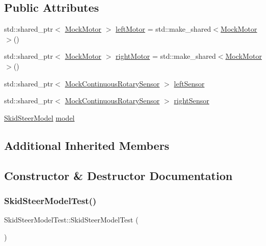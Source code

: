 \subsection*{Public Attributes}
\begin{DoxyCompactItemize}
\item 
std\+::shared\+\_\+ptr$<$ \mbox{\hyperlink{classokapi_1_1MockMotor}{Mock\+Motor}} $>$ \mbox{\hyperlink{classSkidSteerModelTest_ae5f23d1d7503a67dbf677a17915d3960}{left\+Motor}} = std\+::make\+\_\+shared$<$\mbox{\hyperlink{classokapi_1_1MockMotor}{Mock\+Motor}}$>$()
\item 
std\+::shared\+\_\+ptr$<$ \mbox{\hyperlink{classokapi_1_1MockMotor}{Mock\+Motor}} $>$ \mbox{\hyperlink{classSkidSteerModelTest_a77ee903c3e5bb6d5bb9281c34790ac29}{right\+Motor}} = std\+::make\+\_\+shared$<$\mbox{\hyperlink{classokapi_1_1MockMotor}{Mock\+Motor}}$>$()
\item 
std\+::shared\+\_\+ptr$<$ \mbox{\hyperlink{classokapi_1_1MockContinuousRotarySensor}{Mock\+Continuous\+Rotary\+Sensor}} $>$ \mbox{\hyperlink{classSkidSteerModelTest_a915681d0e1c2f96b08f0dbb5fcd07410}{left\+Sensor}}
\item 
std\+::shared\+\_\+ptr$<$ \mbox{\hyperlink{classokapi_1_1MockContinuousRotarySensor}{Mock\+Continuous\+Rotary\+Sensor}} $>$ \mbox{\hyperlink{classSkidSteerModelTest_a5fb5ad90e1b69276d50d288d87601e1b}{right\+Sensor}}
\item 
\mbox{\hyperlink{classokapi_1_1SkidSteerModel}{Skid\+Steer\+Model}} \mbox{\hyperlink{classSkidSteerModelTest_ab890f166fd5c2c83b2dc9ffecc5eb0ca}{model}}
\end{DoxyCompactItemize}
\subsection*{Additional Inherited Members}


\subsection{Constructor \& Destructor Documentation}
\mbox{\label{classSkidSteerModelTest_a9982df40a91b78d26e4d09bb56ec8d84}} 
\subsubsection{\texorpdfstring{SkidSteerModelTest()}{SkidSteerModelTest()}}
{\footnotesize\ttfamily Skid\+Steer\+Model\+Test\+::\+Skid\+Steer\+Model\+Test (\begin{DoxyParamCaption}{ }\end{DoxyParamCaption})\hspace{0.3cm}{\ttfamily [inline]}}



